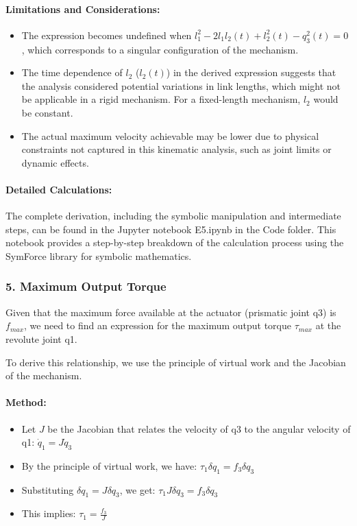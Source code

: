 \begin{solution}
\paragraph{Limitations and Considerations:}
\begin{itemize}
	\item The expression becomes undefined when $l_1^2 - 2l_1l_2(t) + l_2^2(t) - q_3^2(t) = 0$, which corresponds to a singular configuration of the mechanism.
	\item The time dependence of $l_2$ ($l_2(t)$) in the derived expression suggests that the analysis considered potential variations in link lengths, which might not be applicable in a rigid mechanism. For a fixed-length mechanism, $l_2$ would be constant.
	\item The actual maximum velocity achievable may be lower due to physical constraints not captured in this kinematic analysis, such as joint limits or dynamic effects.
\end{itemize}

\paragraph{Detailed Calculations:}
The complete derivation, including the symbolic manipulation and intermediate steps, can be found in the Jupyter notebook E5.ipynb in the Code folder. This notebook provides a step-by-step breakdown of the calculation process using the SymForce library for symbolic mathematics.
    
\subsubsection*{5. Maximum Output Torque}

Given that the maximum force available at the actuator (prismatic joint q3) is $f_{max}$, we need to find an expression for the maximum output torque $\tau_{max}$ at the revolute joint q1.

To derive this relationship, we use the principle of virtual work and the Jacobian of the mechanism.

\paragraph{Method:}
\begin{itemize}
    \item Let $J$ be the Jacobian that relates the velocity of q3 to the angular velocity of q1: $\dot{q}_1 = J \dot{q}_3$
    \item By the principle of virtual work, we have: $\tau_1 \delta q_1 = f_3 \delta q_3$
    \item Substituting $\delta q_1 = J \delta q_3$, we get: $\tau_1 J \delta q_3 = f_3 \delta q_3$
    \item This implies: $\tau_1 = \frac{f_3}{J}$
\end{itemize}


\end{solution}
